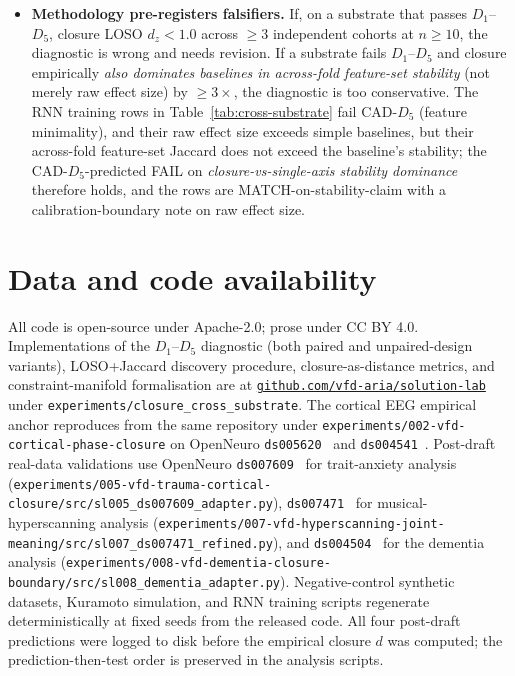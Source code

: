 \documentclass[11pt,a4paper]{article}
\begin{document}
\begin{itemize}
\item \textbf{Methodology pre-registers falsifiers.} If, on a substrate that passes $D_1$--$D_5$, closure LOSO $d_z < 1.0$ across $\geq 3$ independent cohorts at $n \geq 10$, the diagnostic is wrong and needs revision. If a substrate fails $D_1$--$D_5$ and closure empirically \emph{also dominates baselines in across-fold feature-set stability} (not merely raw effect size) by $\geq 3\times$, the diagnostic is too conservative. The RNN training rows in Table~\ref{tab:cross-substrate} fail CAD-$D_5$ (feature minimality), and their raw effect size exceeds simple baselines, but their across-fold feature-set Jaccard does not exceed the baseline's stability; the CAD-$D_5$-predicted FAIL on \emph{closure-vs-single-axis stability dominance} therefore holds, and the rows are MATCH-on-stability-claim with a calibration-boundary note on raw effect size.
\end{itemize}

\section{Data and code availability}\label{sec:data}

All code is open-source under Apache-2.0; prose under CC BY 4.0. Implementations of the $D_1$--$D_5$ diagnostic (both paired and unpaired-design variants), LOSO+Jaccard discovery procedure, closure-as-distance metrics, and constraint-manifold formalisation are at \href{https://github.com/vfd-aria/solution-lab}{\texttt{github.com/vfd-aria/solution-lab}} under \texttt{experiments/closure\_cross\_substrate}. The cortical EEG empirical anchor reproduces from the same repository under \texttt{experiments/002-vfd-cortical-phase-closure} on OpenNeuro \texttt{ds005620}~\citep{bajwa2024dataset} and \texttt{ds004541}~\citep{sainiferron2023dataset}. Post-draft real-data validations use OpenNeuro \texttt{ds007609}~\citep{ShalamberidzeAnxiety2025} for trait-anxiety analysis (\texttt{experiments/005-vfd-trauma-cortical-closure/src/sl005\_ds007609\_adapter.py}), \texttt{ds007471}~\citep{ZhouHyperscanning2026} for musical-hyperscanning analysis (\texttt{experiments/007-vfd-hyperscanning-joint-meaning/src/sl007\_ds007471\_refined.py}), and \texttt{ds004504}~\citep{MiltiadousDementia2023} for the dementia analysis (\texttt{experiments/008-vfd-dementia-closure-boundary/src/sl008\_dementia\_adapter.py}). Negative-control synthetic datasets, Kuramoto simulation, and RNN training scripts regenerate deterministically at fixed seeds from the released code. All four post-draft predictions were logged to disk before the empirical closure $d$ was computed; the prediction-then-test order is preserved in the analysis scripts.
\end{document}

